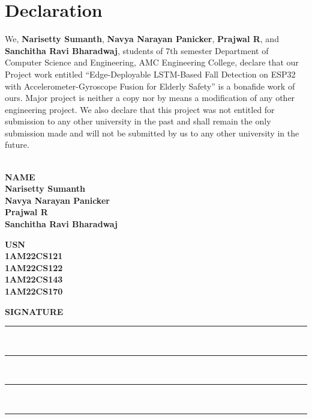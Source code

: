 \documentclass[a4paper, 12pt]{report}
\begin{document}
\chapter*{Declaration}
\thispagestyle{borderedpage}
We, \textbf{Narisetty Sumanth}, \textbf{Navya Narayan Panicker}, \textbf{Prajwal R}, and \textbf{Sanchitha Ravi Bharadwaj}, students of 7th semester Department of Computer Science and Engineering, AMC Engineering College, declare that our Project work entitled “Edge-Deployable LSTM-Based Fall Detection on ESP32 with Accelerometer-Gyroscope Fusion for Elderly Safety” is a bonafide work of ours. Major project is neither a copy nor by means a modification of any other engineering project. We also declare that this project was not entitled for submission to any other university in the past and shall remain the only submission made and will not be submitted by us to any other university in the future.\\
\vspace{1cm}\\
\noindent
\begin{minipage}[t]{0.32\textwidth}
    \centering
    \textbf{NAME\\[0.2cm]Narisetty Sumanth\\[0.2cm]Navya Narayan Panicker\\[0.2cm]Prajwal R\\[0.2cm]Sanchitha Ravi Bharadwaj}
\end{minipage}
\hfill
\begin{minipage}[t]{0.32\textwidth}
    \centering
    \textbf{USN\\[0.2cm]1AM22CS121\\[0.2cm]1AM22CS122\\[0.2cm]1AM22CS143\\[0.2cm]1AM22CS170}
\end{minipage}
\hfill
\begin{minipage}[t]{0.32\textwidth}
    \centering
    \textbf{SIGNATURE\\}
    \vspace{0.4cm}
    \rule{0.8\linewidth}{0.4pt}\\[0.2cm]
    \rule{0.8\linewidth}{0.4pt}\\[0.2cm]
    \rule{0.8\linewidth}{0.4pt}\\[0.2cm]
    \rule{0.8\linewidth}{0.4pt}\\[0.2cm]
\end{minipage}\\
\end{document}
